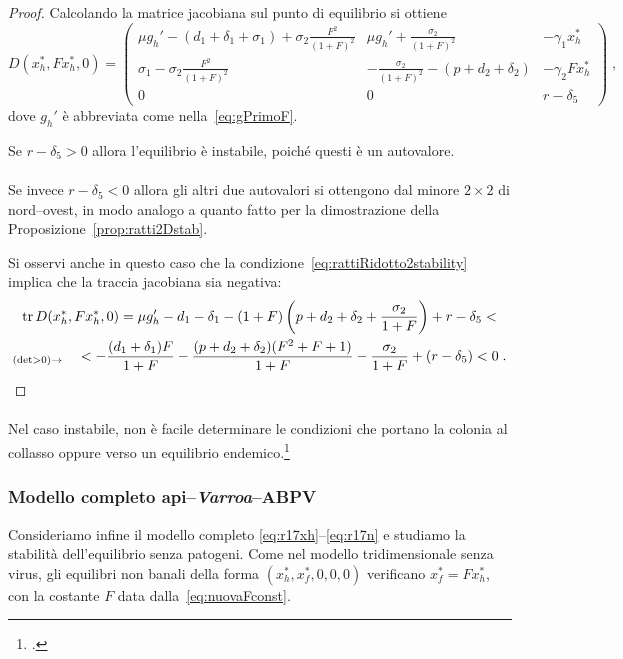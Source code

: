 \begin{proof}
Calcolando la matrice jacobiana sul punto di equilibrio si ottiene
$$ D (x_h^* , F x_h^* , 0) =
\begin{pmatrix}
    \mu g_h' - (d_1 +\delta_1 +\sigma_1) + \sigma_2 \frac{F^2}{(1+F)^2} &
    \mu g_h' + \frac{\sigma_2}{(1+F)^2} &
    -\gamma_1 x_h^*
    \\
    \sigma_1 - \sigma_2 \frac{F^2}{(1+F)^2} &
    - \frac{\sigma_2}{(1+F)^2} - ( p +d_2 +\delta_2) &
    - \gamma_2 F x_h^*
    \\
    0 &
    0 &
    r -\delta_5
    \end{pmatrix}
    \; ,
$$
dove $g_h'$ è abbreviata come nella~\eqref{eq:gPrimoF}.

Se $r -\delta_5 > 0$ allora l'equilibrio è instabile, poiché questi è un autovalore.

\paragraph{}
Se invece $r - \delta_5 <0$ allora gli altri due autovalori si ottengono dal minore $2 \times 2$
di nord--ovest, in modo analogo a quanto fatto
per la dimostrazione della Proposizione~\ref{prop:ratti2Dstab}.

Si osservi anche in questo caso che la condizione~\eqref{eq:rattiRidotto2stability} implica che la traccia
jacobiana sia negativa:
\begin{multline*}
\operatorname{tr} D (x_h^* , F x_h^* , 0) = \mu g_h' - d_1 -\delta_1 - (1+F) \left( p + d_2 + \delta_2 + \frac{\sigma_2}{1+F} \right)
+ r - \delta_5 < \\
 _{(\det >0) \rightarrow} \quad
< - \frac{(d_1+\delta_1) F}{1+F} - \frac{(p +d_2+\delta_2) (F^2 +F+1)}{1+F} - \frac{\sigma_2}{1+F}  + (r -\delta_5) < 0 \; .
\end{multline*}

\end{proof}

\paragraph{}
Nel caso instabile, non è facile determinare le condizioni che portano la colonia al collasso oppure
verso un equilibrio endemico.\footcite[15]{ratti2017}


\subsubsection{Modello completo api--\emph{Varroa}--ABPV}
Consideriamo infine il modello completo \eqref{eq:r17xh}--\eqref{eq:r17n} e studiamo la stabilità
dell'equilibrio senza patogeni.
Come nel modello tridimensionale senza virus, gli equilibri non banali della
forma $(x_h^*, x_f^*, 0,0,0)$ verificano $x_f^* = F x_h^*$, con
la costante $F$ data dalla~\eqref{eq:nuovaFconst}.

